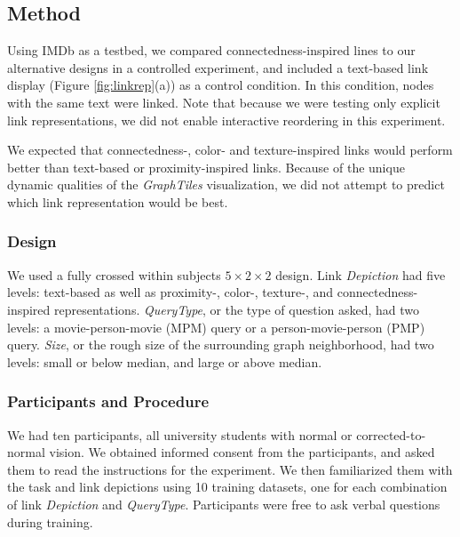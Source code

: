 \subsection{Method}

Using IMDb as a testbed, we compared connectedness-inspired lines to our alternative designs in a controlled experiment, and included a text-based link display (Figure \ref{fig:linkrep}(a)) as a control condition. In this condition, nodes with the same text were linked. Note that because we were testing only explicit link representations, we did not enable interactive reordering in this experiment.

We expected that connectedness-, color- and texture-inspired links would perform better than text-based or proximity-inspired links. Because of the unique dynamic qualities of the \textit{GraphTiles} visualization, we did not attempt to predict which link representation would be best.

\subsubsection{Design}

We used a fully crossed within subjects $5 \times 2 \times 2$ design. Link \textit{Depiction} had five levels: text-based as well as proximity-, color-, texture-, and connectedness-inspired representations. \textit{QueryType}, or the type of question asked, had two levels: a movie-person-movie (MPM) query or a person-movie-person (PMP) query. \textit{Size}, or the rough size of the surrounding graph neighborhood, had two levels: small or below median, and large or above median.


\subsubsection{Participants and Procedure}

We had ten participants, all university students with normal or corrected-to-normal vision. We obtained informed consent from the participants, and asked them to read the instructions for the experiment. We then familiarized them with the task and link depictions using 10 training datasets, one for each combination of link \textit{Depiction} and \textit{QueryType}. Participants were free to ask verbal questions during training.


